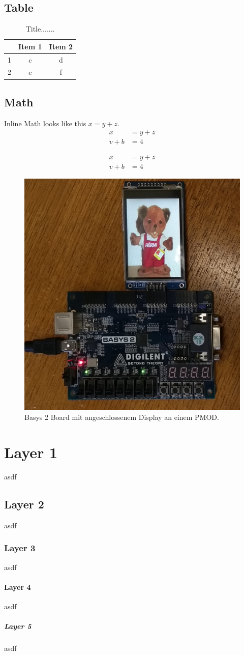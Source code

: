 \subsection{Table}
\begin{table}[H] %
	\begin{center}
		\begin{tabular}{c|cc}
			& Item 1 & Item 2 \\
			\hline
			1 & c & d \\
			2 & e & f
		\end{tabular}
		\caption{Title.......}
		\label{tab:8bitnumber}
	\end{center}
\end{table}

\subsection{Math}
Inline Math looks like this $x = y + z$.
\begin{align}
	x &= y + z \\
	v + b &= 4
\end{align}

\begin{align*}
x &= y + z \\
v + b &= 4
\end{align*}

\pagebreak

\begin{figure}[H]
	\centering
	\includegraphics[width=0.5\linewidth]{inc/img/display_projekt/display_bsp_fpga}
	\caption{Basys 2 Board mit angeschlossenem Display an einem PMOD.}
	\label{fig:display_bespiel_angeschlossen}
\end{figure}

\pagebreak

\section{Layer 1}
asdf
\subsection{Layer 2}
asdf
\subsubsection{Layer 3}
asdf
\paragraph{Layer 4}
asdf
\subparagraph{Layer 5}
asdf